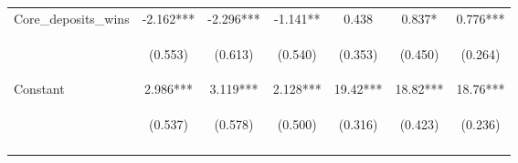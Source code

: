 \documentclass[]{article}
\begin{document}
\begin{center}
\begin{tabular}{lcccccc}
Core\_deposits\_wins & -2.162*** & -2.296*** & -1.141** & 0.438 & 0.837* & 0.776*** \\
\vspace{4pt} & \begin{footnotesize}(0.553)\end{footnotesize} & \begin{footnotesize}(0.613)\end{footnotesize} & \begin{footnotesize}(0.540)\end{footnotesize} & \begin{footnotesize}(0.353)\end{footnotesize} & \begin{footnotesize}(0.450)\end{footnotesize} & \begin{footnotesize}(0.264)\end{footnotesize} \\
Constant & 2.986*** & 3.119*** & 2.128*** & 19.42*** & 18.82*** & 18.76*** \\
 & \begin{footnotesize}(0.537)\end{footnotesize} & \begin{footnotesize}(0.578)\end{footnotesize} & \begin{footnotesize}(0.500)\end{footnotesize} & \begin{footnotesize}(0.316)\end{footnotesize} & \begin{footnotesize}(0.423)\end{footnotesize} & \begin{footnotesize}(0.236)\end{footnotesize} \\
\vspace{4pt} & \begin{footnotesize}\end{footnotesize} & \begin{footnotesize}\end{footnotesize} & \begin{footnotesize}\end{footnotesize} & \begin{footnotesize}\end{footnotesize} & \begin{footnotesize}\end{footnotesize} & \begin{footnotesize}\end{footnotesize} \\

\end{tabular}
\end{center}
\end{document}
